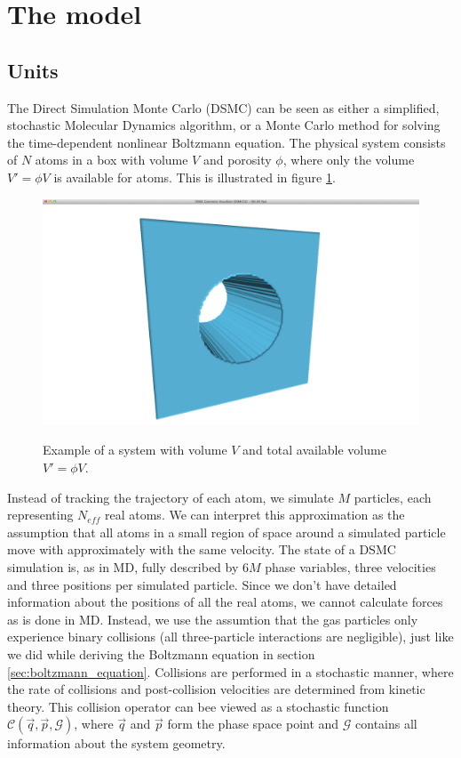 \section{The model}
\subsection{Units}
\label{sec:dsmc_model}
The Direct Simulation Monte Carlo (DSMC) can be seen as either a simplified, stochastic Molecular Dynamics algorithm, or a Monte Carlo method for solving the time-dependent nonlinear Boltzmann equation. The physical system consists of $N$ atoms in a box with volume $V$ and porosity $\phi$, where only the volume $V' = \phi V$ is available for atoms. This is illustrated in figure \ref{fig:cylinder}.
\begin{figure}[h]
\begin{center}
\includegraphics[width=\textwidth, trim=0cm 0cm 0cm 0cm, clip]{DSMC/figures/cylinder.png}
\label{fig:cylinder}
\end{center}
\caption{Example of a system with volume $V$ and total available volume $V' = \phi V$.}
\end{figure}
Instead of tracking the trajectory of each atom, we simulate $M$ particles, each representing $N_{eff}$ real atoms. We can interpret this approximation as the assumption that all atoms in a small region of space around a simulated particle move with approximately with the same velocity. The state of a DSMC simulation is, as in MD, fully described by $6M$ phase variables, three velocities and three positions per simulated particle. Since we don't have detailed information about the positions of all the real atoms, we cannot calculate forces as is done in MD. Instead, we use the assumtion that the gas particles only experience binary collisions (all three-particle interactions are negligible), just like we did while deriving the Boltzmann equation in section \ref{sec:boltzmann_equation}. Collisions are performed in a stochastic manner, where the rate of collisions and post-collision velocities are determined from kinetic theory. This collision operator can bee viewed as a stochastic function $\mathcal{C}(\vec q, \vec p, \mathcal{G})$, where $\vec q$ and $\vec p$ form the phase space point and $\mathcal G$ contains all information about the system geometry.\\
